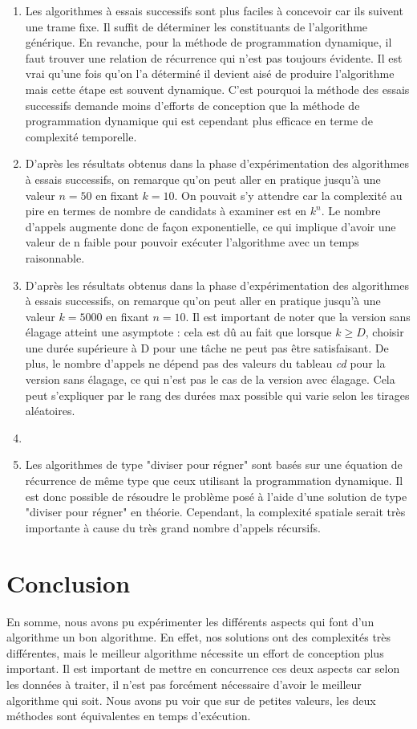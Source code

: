 \documentclass[a4paper, titlepage]{article}
\begin{document}
\begin{enumerate}
\item
	Les algorithmes à essais successifs sont plus faciles à concevoir car ils suivent une trame fixe.
	Il suffit de déterminer les constituants de l'algorithme générique.
	En revanche, pour la méthode de programmation dynamique, il faut trouver une relation de récurrence qui n'est pas toujours évidente.
	Il est vrai qu'une fois qu'on l'a déterminé il devient aisé de produire l'algorithme mais cette étape est souvent dynamique.
	C'est pourquoi la méthode des essais successifs demande moins d'efforts de conception que la méthode de programmation dynamique qui est cependant plus efficace en terme de complexité temporelle.
\item
	D'après les résultats obtenus dans la phase d'expérimentation des algorithmes à essais successifs, on remarque qu'on peut aller en pratique jusqu'à une valeur $n = 50$ en fixant $k = 10$.
	On pouvait s'y attendre car la complexité au pire en termes de nombre de candidats à examiner est en $k^n$.
	Le nombre d'appels augmente donc de façon exponentielle, ce qui implique d'avoir une valeur de n faible pour pouvoir exécuter l'algorithme avec un temps raisonnable.
\item
	D'après les résultats obtenus dans la phase d'expérimentation des algorithmes à essais successifs, on remarque qu'on peut aller en pratique jusqu'à une valeur $k = 5000$ en fixant $n = 10$.
	Il est important de noter que la version sans élagage atteint une asymptote : cela est dû au fait que lorsque $k \ge D$, choisir une durée supérieure à D pour une tâche ne peut pas être satisfaisant.
	De plus, le nombre d'appels ne dépend pas des valeurs du tableau \emph{cd} pour la version sans élagage, ce qui n'est pas le cas de la version avec élagage.
	Cela peut s'expliquer par le rang des durées max possible qui varie selon les tirages aléatoires.
\item
\item
	Les algorithmes de type "diviser pour régner" sont basés sur une équation de récurrence de même type que ceux utilisant la programmation dynamique.
	Il est donc possible de résoudre le problème posé à l'aide d'une solution de type "diviser pour régner" en théorie.
	Cependant, la complexité spatiale serait très importante à cause du très grand nombre d'appels récursifs.
\end{enumerate}

\section{Conclusion}

En somme, nous avons pu expérimenter les différents aspects qui font d'un algorithme un bon algorithme.
En effet, nos solutions ont des complexités très différentes, mais le meilleur algorithme nécessite un effort de conception plus important.
Il est important de mettre en concurrence ces deux aspects car selon les données à traiter, il n'est pas forcément nécessaire d'avoir le meilleur algorithme qui soit.
Nous avons pu voir que sur de petites valeurs, les deux méthodes sont équivalentes en temps d'exécution.
\end{document}
